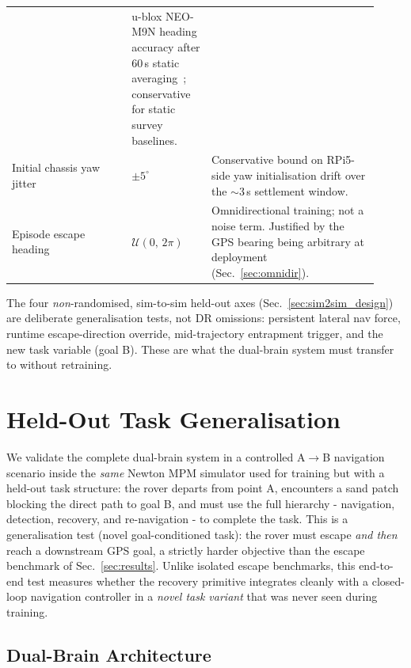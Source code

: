 \documentclass[conference]{IEEEtran}
\begin{document}
\begin{table}[!htbp]
\begin{tabular}{@{}p{0.30\linewidth} p{0.20\linewidth} p{0.42\linewidth}@{}}
      & u-blox NEO-M9N heading accuracy after 60\,s static
        averaging~\cite{ublox_neom9n_datasheet}; conservative for static
        survey baselines. \\
    Initial chassis yaw jitter
      & $\pm 5^{\circ}$
      & Conservative bound on RPi5-side yaw initialisation drift over the
        $\sim$3\,s settlement window. \\
    Episode escape heading
      & $\mathcal{U}(0,\,2\pi)$
      & Omnidirectional training; not a noise term. Justified by the GPS
        bearing being arbitrary at deployment (Sec.~\ref{sec:omnidir}). \\
    \bottomrule
  \end{tabular}
\end{table}

The four \emph{non}-randomised, sim-to-sim held-out axes
(Sec.~\ref{sec:sim2sim_design}) are deliberate generalisation tests, not DR
omissions: persistent lateral nav force, runtime escape-direction override,
mid-trajectory entrapment trigger, and the new task variable (goal B). These
are what the dual-brain system must transfer to without retraining.

\section{Held-Out Task Generalisation}
\label{sec:sim2sim}

We validate the complete dual-brain system in a controlled A$\to$B navigation
scenario inside the \emph{same} Newton MPM simulator used for training but with
a held-out task structure: the rover departs from point A, encounters a sand
patch blocking the direct path to goal B, and must use the full hierarchy -
navigation, detection, recovery, and re-navigation - to complete the task.
This is a generalisation test (novel goal-conditioned task): the rover must
escape \emph{and then} reach a downstream GPS goal, a strictly harder objective
than the escape benchmark of Sec.~\ref{sec:results}.
Unlike isolated escape benchmarks, this end-to-end test measures whether the
recovery primitive integrates cleanly with a closed-loop navigation controller
in a \emph{novel task variant} that was never seen during training.

\subsection{Dual-Brain Architecture}
\end{document}
